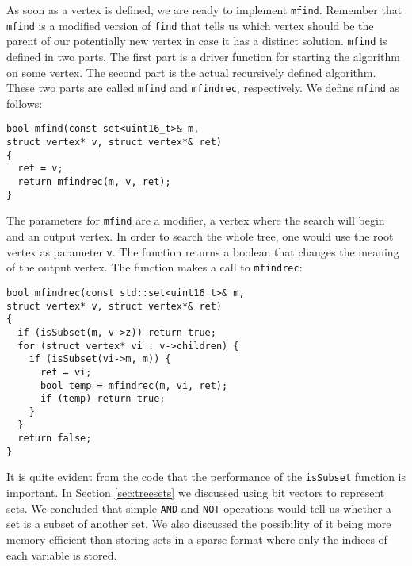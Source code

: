 As soon as a vertex is defined, we are ready to implement \texttt{mfind}.
Remember that \texttt{mfind} is a modified version of \texttt{find} that tells
us which vertex should be the parent of our potentially new vertex in case it
has a distinct solution.
\texttt{mfind} is defined in two parts. The first part is a driver function
for starting the algorithm on some vertex. The second part is the actual
recursively defined algorithm. These two parts are called \texttt{mfind} and
\texttt{mfindrec}, respectively. We define \texttt{mfind} as follows:
\begin{verbatim}
bool mfind(const set<uint16_t>& m,
struct vertex* v, struct vertex*& ret)
{
  ret = v;
  return mfindrec(m, v, ret);
}
\end{verbatim}
The parameters for \texttt{mfind} are a modifier, a vertex where the search
will begin and an output vertex.
In order to search the whole tree, one would use the root vertex as parameter
\texttt{v}.
The function returns a boolean that changes the meaning of the output vertex.
The function makes a call to \texttt{mfindrec}:
\begin{verbatim}
bool mfindrec(const std::set<uint16_t>& m,
struct vertex* v, struct vertex*& ret)
{
  if (isSubset(m, v->z)) return true;
  for (struct vertex* vi : v->children) {
    if (isSubset(vi->m, m)) {
      ret = vi; 
      bool temp = mfindrec(m, vi, ret);
      if (temp) return true;
    }   
  }   
  return false;
}
\end{verbatim}
It is quite evident from the code that the performance of the \texttt{isSubset}
function is important. In Section \ref{sec:treesets} we discussed using bit
vectors  to represent sets. We concluded that simple \texttt{AND} and
\texttt{NOT} operations would tell us whether a set is a subset of another
set.
We also discussed the possibility of it being more memory efficient than
storing sets in a sparse format where only the indices of each variable is 
stored.

